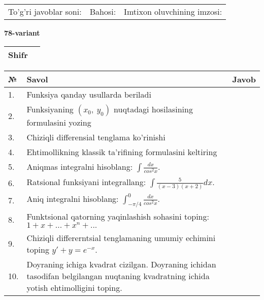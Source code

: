 \documentclass{article}
\begin{document}
  \vspace{1cm}
  
  \begin{tabular}{lll}
  To'g'ri javoblar soni: \underline{\hspace{1.5cm}} & 
  Bahosi: \underline{\hspace{1.5cm}} & 
  Imtixon oluvchining imzosi: \underline{\hspace{2cm}} \\
  \end{tabular}
  
  \egroup
  
  \newpage
  
  
  \textbf{78-variant}\\
  
  \bgroup
  \def\arraystretch{1.6} %
  
  \begin{tabular}{|m{5.7cm}|m{9.5cm}|}
  \hline
  Shifr & \\
  \hline
  \end{tabular}
  
  \vspace{1cm}
  
  \begin{tabular}{|m{0.7cm}|m{10cm}|m{4cm}|}
  \hline
  № & Savol & Javob \\
  \hline
  1. & Funksiya qanday usullarda beriladi &  \\
  \hline
  2. & Funksiyaning \((x_{0},\ y_{0})\) nuqtadagi hosilasining formulasini yozing &  \\
  \hline
  3. & Chiziqli differensial tenglama ko'rinishi &  \\
  \hline
  4. & Ehtimollikning klassik ta'rifining formulasini keltiring &  \\
  \hline
  5. & Aniqmas integralni hisoblang: \(\int \frac{dx}{cos^{2}x}\). &  \\
  \hline
  6. & Ratsional funksiyani integrallang: \(\int {\frac{5}{(x - 3)(x + 2)}dx}\). &  \\
  \hline
  7. & Aniq integralni hisoblang: \(\int_{- \pi/4}^{0}\frac{dx}{cos^{2}x}\). &  \\
  \hline
  8. & Funktsional qatorning yaqinlashish sohasini toping:\(1 + x + ... + x^{n} + ...\) &  \\
  \hline
  9. & Chiziqli differerntsial tenglamaning umumiy echimini toping \(y' + y = e^{- x}\). &  \\
  \hline
  10. & Doyraning ichiga kvadrat cizilgan. Doyraning ichidan tasodifan belgilangan nuqtaning kvadratning ichida yotish ehtimolligini toping. &  \\
  \hline
  \end{tabular}
  
\end{document}
